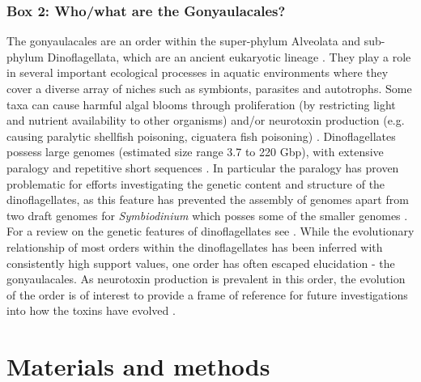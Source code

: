 \documentclass[12pt]{article}
\begin{document}
\subsubsection{Box 2: Who/what are the Gonyaulacales?}
\label{sec:dinobox}
The gonyaulacales are an order within the super-phylum Alveolata and sub-phylum Dinoflagellata, which are an ancient eukaryotic lineage \cite{moldowan1998biogeochemical}. 
They play a role in several important ecological processes in aquatic environments where they cover a diverse array of niches such as symbionts, parasites and autotrophs. 
Some taxa can cause harmful algal blooms through proliferation (by restricting light and nutrient availability to other organisms) and/or neurotoxin production (e.g. causing paralytic shellfish poisoning, ciguatera fish poisoning) \cite{murray2016unravelling}.
Dinoflagellates possess large genomes (estimated size range 3.7 to 220 Gbp), with extensive paralogy and repetitive short sequences  \cite{casabianca2017genome,murray2016unravelling}. 
In particular the paralogy has proven problematic for efforts investigating the genetic content and structure of the dinoflagellates, as this feature has prevented the assembly of genomes apart from two draft genomes for \textit{Symbiodinium} which posses some of the smaller genomes \cite{shoguchi2013draft,lin2015symbiodinium}. 
For a review on the genetic features of dinoflagellates see \cite{murray2016unravelling}. 
While the evolutionary relationship of most orders within the dinoflagellates has been inferred with consistently high support values, one order has often escaped elucidation - the gonyaulacales. 
As neurotoxin production is prevalent in this order, the evolution of the order is of interest to provide a frame of reference for future investigations into how the toxins have evolved \cite{shalchian2006combined,zhang2007three,saldarriaga2004molecular,hoppenrath2010dinoflagellate,murray2005improving}. 

\newpage
\section{Materials and methods}
\end{document}
